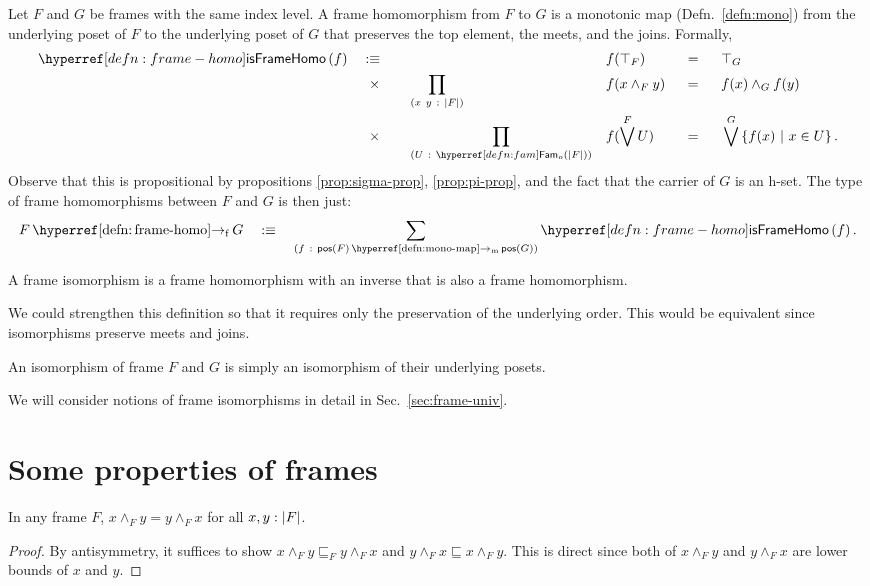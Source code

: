 \begin{defn}\label{defn:frame-homo}
  Let $F$ and $G$ be frames with the same index level. A frame homomorphism from $F$ to
  $G$ is a monotonic map (Defn.~\ref{defn:mono}) from the underlying poset of $F$ to the
  underlying poset of $G$ that preserves the top element, the meets, and the joins.
  Formally,
  \begin{alignat*}{5}
    \isframehomo{f} \quad&\is\quad && &&f(\top_F) &&\idnm{} &&\top_G \\
      &\hspace{0.55em}\times\quad  &&\pity{x~y}{\abs{F}}{&&f(x \wedge_F y) &&\idnm{} &&f(x) \wedge_G f(y)} \\
      &\hspace{0.55em}\times\quad  &&\pity{U}{\sub{o}{\abs{F}}}{&&f(\bigvee^F U) &&\idnm{} &&\bigvee^G \setof{ f(x) ~|~ x \in U }}.
  \end{alignat*}
  Observe that this is propositional by propositions \ref{prop:sigma-prop},
  \ref{prop:pi-prop}, and the fact that the carrier of $G$ is an h-set. The type of frame
  homomorphisms between $F$ and $G$ is then just:
  \begin{equation*}
    \framehomo{F}{G} \quad\is\quad \sigmaty{f}{\mono{\posof{F}}{\posof{G}}}{\isframehomo{f}}.
  \end{equation*}
\end{defn}

\begin{defn}\label{defn:frame-iso}
  A frame isomorphism is a frame homomorphism with an inverse that is also a frame
  homomorphism.
\end{defn}

We could strengthen this definition so that it requires only the preservation of the
underlying order. This would be equivalent since isomorphisms preserve meets and joins.
\begin{defn}\label{defn:frame-iso-official}
  An isomorphism of frame $F$ and $G$ is simply an isomorphism of their underlying posets.
\end{defn}
We will consider notions of frame isomorphisms in detail in Sec.~\ref{sec:frame-univ}.

\section{Some properties of frames}

\begin{prop}\label{prop:comm}
  In any frame $F$, $x \wedge_F y = y \wedge_F x$ for all $x, y:\left| F \right|$.
\end{prop}
\begin{proof}
  By antisymmetry, it suffices to show $x \wedge_F y \sqsubseteq_F y \wedge_F x$ and $y \wedge_F x \sqsubseteq x \wedge_F y$. This
  is direct since both of $x \wedge_F y$ and $y \wedge_F x$ are lower bounds of $x$ and $y$.
\end{proof}

